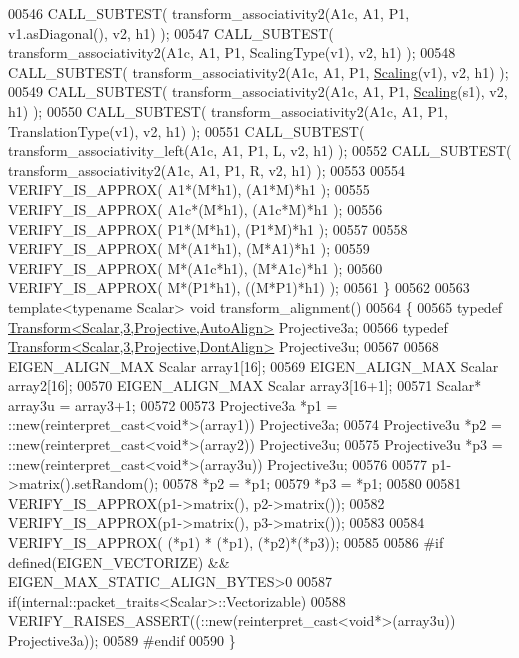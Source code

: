 \begin{DoxyCode}
00546   CALL\_SUBTEST( transform\_associativity2(A1c, A1, P1, v1.asDiagonal(), v2, h1) );
00547   CALL\_SUBTEST( transform\_associativity2(A1c, A1, P1, ScalingType(v1), v2, h1) );
00548   CALL\_SUBTEST( transform\_associativity2(A1c, A1, P1, \hyperlink{group___geometry___module_ga23a8ed57e3f2973526026765ae697761}{Scaling}(v1), v2, h1) );
00549   CALL\_SUBTEST( transform\_associativity2(A1c, A1, P1, \hyperlink{group___geometry___module_ga23a8ed57e3f2973526026765ae697761}{Scaling}(s1), v2, h1) );
00550   CALL\_SUBTEST( transform\_associativity2(A1c, A1, P1, TranslationType(v1), v2, h1) );
00551   CALL\_SUBTEST( transform\_associativity\_left(A1c, A1, P1, L, v2, h1) );
00552   CALL\_SUBTEST( transform\_associativity2(A1c, A1, P1, R, v2, h1) );
00553 
00554   VERIFY\_IS\_APPROX( A1*(M*h1), (A1*M)*h1 );
00555   VERIFY\_IS\_APPROX( A1c*(M*h1), (A1c*M)*h1 );
00556   VERIFY\_IS\_APPROX( P1*(M*h1), (P1*M)*h1 );
00557 
00558   VERIFY\_IS\_APPROX( M*(A1*h1), (M*A1)*h1 );
00559   VERIFY\_IS\_APPROX( M*(A1c*h1), (M*A1c)*h1 );
00560   VERIFY\_IS\_APPROX( M*(P1*h1),  ((M*P1)*h1) );
00561 \}
00562 
00563 \textcolor{keyword}{template}<\textcolor{keyword}{typename} Scalar> \textcolor{keywordtype}{void} transform\_alignment()
00564 \{
00565   \textcolor{keyword}{typedef} \hyperlink{group___geometry___module_class_eigen_1_1_transform}{Transform<Scalar,3,Projective,AutoAlign>} Projective3a;
00566   \textcolor{keyword}{typedef} \hyperlink{group___geometry___module_class_eigen_1_1_transform}{Transform<Scalar,3,Projective,DontAlign>} Projective3u;
00567 
00568   EIGEN\_ALIGN\_MAX Scalar array1[16];
00569   EIGEN\_ALIGN\_MAX Scalar array2[16];
00570   EIGEN\_ALIGN\_MAX Scalar array3[16+1];
00571   Scalar* array3u = array3+1;
00572 
00573   Projective3a *p1 = ::new(reinterpret\_cast<void*>(array1)) Projective3a;
00574   Projective3u *p2 = ::new(reinterpret\_cast<void*>(array2)) Projective3u;
00575   Projective3u *p3 = ::new(reinterpret\_cast<void*>(array3u)) Projective3u;
00576   
00577   p1->matrix().setRandom();
00578   *p2 = *p1;
00579   *p3 = *p1;
00580 
00581   VERIFY\_IS\_APPROX(p1->matrix(), p2->matrix());
00582   VERIFY\_IS\_APPROX(p1->matrix(), p3->matrix());
00583   
00584   VERIFY\_IS\_APPROX( (*p1) * (*p1), (*p2)*(*p3));
00585   
00586 \textcolor{preprocessor}{  #if defined(EIGEN\_VECTORIZE) && EIGEN\_MAX\_STATIC\_ALIGN\_BYTES>0}
00587   \textcolor{keywordflow}{if}(internal::packet\_traits<Scalar>::Vectorizable)
00588     VERIFY\_RAISES\_ASSERT((::\textcolor{keyword}{new}(reinterpret\_cast<void*>(array3u)) Projective3a));
00589 \textcolor{preprocessor}{  #endif}
00590 \}

\end{DoxyCode}
